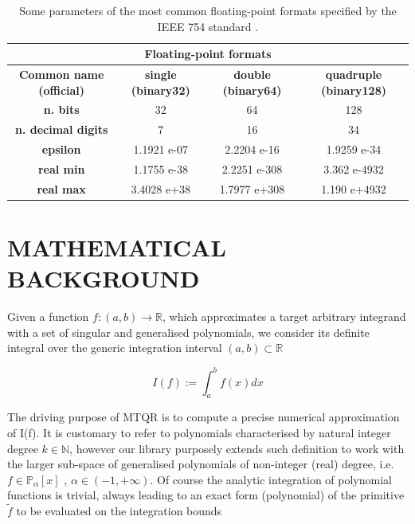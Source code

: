 \documentclass[a4paper, twosided]{book}
\begin{document}
\begin{table}[H]
\centering
\begin{tabular}{|c||c|c|c|}
\hline
\multicolumn{4}{|c|}{\textbf{Floating-point formats}} \\
\hline
\textbf{Common name (official)} & \textbf{single (binary32)} & \textbf{double (binary64)} & \textbf{quadruple (binary128)} \\
\hline
\textbf{n. bits}                & 32          & 64           & 128          \\
\textbf{n. decimal digits}      & 7           & 16           & 34           \\
\textbf{epsilon}                & 1.1921 e-07 & 2.2204 e-16  & 1.9259 e-34  \\
\textbf{real min}               & 1.1755 e-38 & 2.2251 e-308 & 3.362 e-4932 \\
\textbf{real max}               & 3.4028 e+38 & 1.7977 e+308 & 1.190 e+4932 \\
\hline
\end{tabular}
  \caption{Some parameters of the most common floating-point formats specified by the IEEE 754 standard \cite{IEEE754}.}
  \label{table1.1}
\end{table}

\newpage
\section[Mathematical background]{\changefont MATHEMATICAL BACKGROUND}\label{Sec1.2}

\noindent
Given a function $f:(a,b)\to\mathbb{R}$, which approximates a target arbitrary integrand with a set of singular and generalised polynomials, we consider its definite integral over the generic integration interval $(a,b)\subset\mathbb{R}$

\begin{equation}\label{eq1.1}
    I(f):=\int_{a}^{b}f(x)dx
\end{equation}

\noindent
The driving purpose of MTQR is to compute a precise numerical approximation of I(f). It is customary to refer to polynomials characterised by natural integer degree $k\in\mathbb{N}$, however our library purposely extends such definition to work with the larger sub-space of generalised polynomials of non-integer (real) degree, i.e. $f\in\mathbb{P}_{\alpha}[x]$ , $\alpha\in(-1,+\infty)$. Of course the analytic integration of polynomial functions is trivial, always leading to an exact form (polynomial) of the primitive $\tilde{f}$ to be evaluated on the integration bounds
\end{document}
